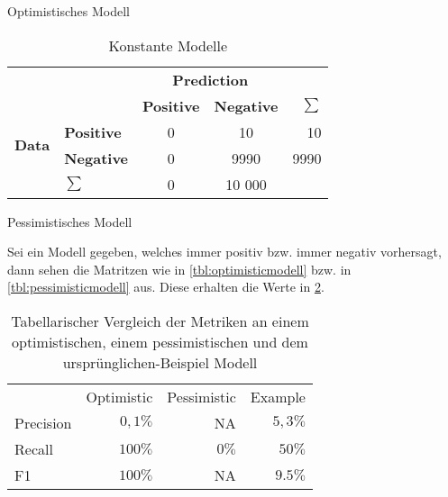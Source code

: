 \begin{table}
\begin{subtable}{0.45\textwidth}
		\caption{Optimistisches Modell}
		\label{tbl:optimisticmodell}
	\end{subtable}
	\hfill
	\begin{subtable}{0.45\textwidth}
		\begin{center}
			\begin{tabularx}{\textwidth}{l l | c c | r}
				                               &                   & \multicolumn{2}{c|}{\textbf{Prediction}} &                            \\
				                               &                   & \textbf{Positive}                        & \textbf{Negative} & $\sum$ \\
				\cline{1-5}
				\multirow{2}{*}{\textbf{Data}} & \textbf{Positive} & 0                                        & 10                & 10     \\
				                               & \textbf{Negative} & 0                                        & 9990              & 9990   \\
				\cline{1-5}
				                               & $\sum$            & 0                                        & 10 000            &
			\end{tabularx}
		\end{center}
		\caption{Pessimistisches Modell}
		\label{tbl:pessimisticmodell}
	\end{subtable}
	\caption{Konstante Modelle}
	\label{tbl:constant-modells}
\end{table}

Sei ein Modell gegeben, 
welches immer positiv bzw. immer negativ vorhersagt,
dann sehen die Matritzen wie in \cref{tbl:optimisticmodell} bzw. in \cref{tbl:pessimisticmodell} aus.
Diese erhalten die Werte in \cref{tbl:examplemetricsoverview}.

\begin{table}
	\begin{center}
		\begin{tabularx}{0.5\textwidth}{l r r r}
			          & Optimistic & Pessimistic & Example   \\
			Precision & \(0,1\%\)  & NA          & \(5,3\%\) \\
			Recall    & \(100\%\)  & \(0\%\)     & \(50\%\)  \\
			F1        & \( 100\%\) & NA          & \(9.5\%\)
		\end{tabularx}
	\end{center}
	\caption{Tabellarischer Vergleich der Metriken an einem optimistischen, einem pessimistischen und dem ursprünglichen-Beispiel Modell}
	\label{tbl:examplemetricsoverview}
\end{table}

